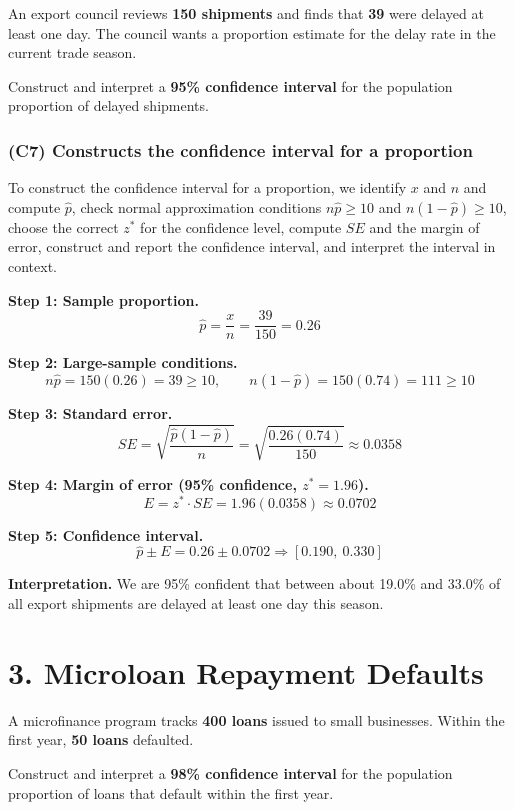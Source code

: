 	An export council reviews \textbf{150 shipments} and finds that \textbf{39} were delayed at least one day. The council wants a proportion estimate for the delay rate in the current trade season.
	
	Construct and interpret a \textbf{95\% confidence interval} for the population proportion of delayed shipments.
	
	\subsubsection*{(C7) Constructs the confidence interval for a proportion}
	To construct the confidence interval for a proportion, we identify \(x\) and \(n\) and compute \(\hat{p}\), check normal approximation conditions \(n\hat{p} \ge 10\) and \(n(1-\hat{p}) \ge 10\), choose the correct \(z^*\) for the confidence level, compute \(SE\) and the margin of error, construct and report the confidence interval, and interpret the interval in context.
	
	\textbf{Step 1: Sample proportion.}
	\[
	\hat{p} = \frac{x}{n} = \frac{39}{150} = 0.26
	\]
	
	\textbf{Step 2: Large-sample conditions.}
	\[
	n\hat{p} = 150(0.26) = 39 \ge 10, \qquad n(1-\hat{p}) = 150(0.74) = 111 \ge 10
	\]
	
	\textbf{Step 3: Standard error.}
	\[
	SE = \sqrt{\frac{\hat{p}(1-\hat{p})}{n}} = \sqrt{\frac{0.26(0.74)}{150}} \approx 0.0358
	\]
	
	\textbf{Step 4: Margin of error (95\% confidence, \(z^* = 1.96\)).}
	\[
	E = z^* \cdot SE = 1.96(0.0358) \approx 0.0702
	\]
	
	\textbf{Step 5: Confidence interval.}
	\[
	\hat{p} \pm E = 0.26 \pm 0.0702 \Rightarrow [0.190,\ 0.330]
	\]
	
	\textbf{Interpretation.}
	We are 95\% confident that between about 19.0\% and 33.0\% of all export shipments are delayed at least one day this season.
	
	\section*{3. Microloan Repayment Defaults}
	
	A microfinance program tracks \textbf{400 loans} issued to small businesses. Within the first year, \textbf{50 loans} defaulted.
	
	Construct and interpret a \textbf{98\% confidence interval} for the population proportion of loans that default within the first year.
	
